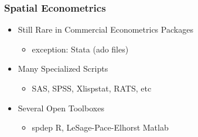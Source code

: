 \documentclass{beamer}
\begin{document}
\begin{frame}\frametitle{Spatial Econometrics}
  \begin{itemize}
    \item Still Rare in Commercial Econometrics Packages
      \begin{itemize}
        \item exception: Stata (ado files)
      \end{itemize}
    \item Many Specialized Scripts
    \begin{itemize}
        \item SAS, SPSS, Xlispstat, RATS, etc
    \end{itemize}
    \item Several Open Toolboxes
      \begin{itemize}
        \item spdep R, LeSage-Pace-Elhorst Matlab
      \end{itemize}
  \end{itemize}
  
\end{frame}
\end{document}
